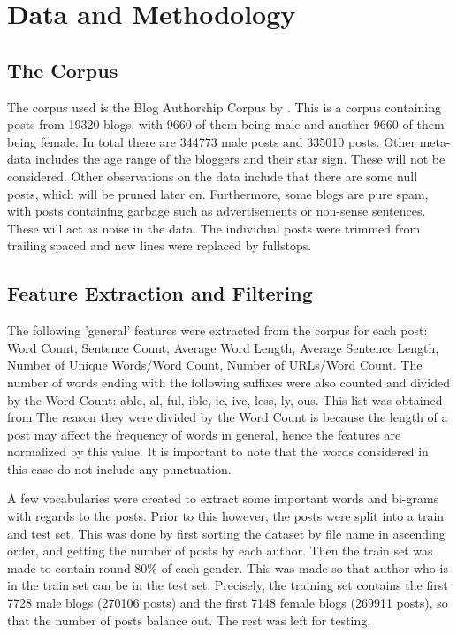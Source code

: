 \section{Data and Methodology}

\subsection{The Corpus}
The corpus used is the Blog Authorship Corpus by \cite{2}. This is a corpus containing posts from 19320 blogs, with 9660 of them being male and another 9660 of them being female. In total there are 344773 male posts and 335010 posts. Other meta-data includes the age range of the bloggers and their star sign. These will not be considered. Other observations on the data include that there are some null posts, which will be pruned later on. Furthermore, some blogs are pure spam, with posts containing garbage such as advertisements or non-sense sentences. These will act as noise in the data. The individual posts were trimmed from trailing spaced and new lines were replaced by fullstops.


\subsection{Feature Extraction and Filtering}
The following 'general' features were extracted from the corpus for each post: Word Count, Sentence Count, Average Word Length, Average Sentence Length, Number of Unique Words/Word Count, Number of URLs/Word Count. The number of words ending with the following suffixes were also counted and divided by the Word Count: able, al, ful, ible, ic, ive, less, ly, ous. This list was obtained from \cite{4} The reason they were divided by the Word Count is because the length of a post may affect the frequency of words in general, hence the features are normalized by this value. It is important to note that the words considered in this case do not include any punctuation.

A few vocabularies were created to extract some important words and bi-grams with regards to the posts. Prior to this however, the posts were split into a train and test set. This was done by first sorting the dataset by file name in ascending order, and getting the number of posts by each author. Then the train set was made to contain round 80\% of each gender. This was made so that author who is in the train set can be in the test set. Precisely, the training set contains the first 7728 male blogs (270106 posts) and the first 7148 female blogs (269911 posts), so that the number of posts balance out. The rest was left for testing.


